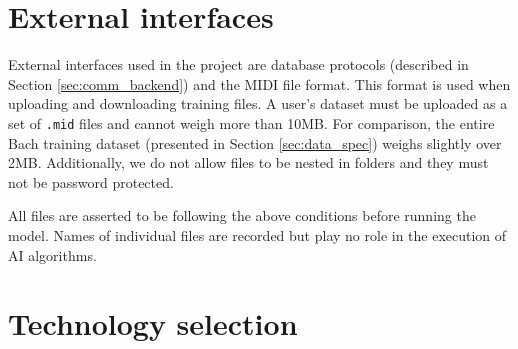 \documentclass[a4paper, 11pt, twoside]{report}
\theoremstyle{definition}
\begin{document}
\section{External interfaces} \label{ex_interfaces}

External interfaces used in the project are database protocols (described in Section \ref{sec:comm_backend}) and the MIDI file format. This format is used when uploading and downloading training files. A user's dataset must be uploaded as a set of \texttt{.mid} files and cannot weigh more than 10MB. For comparison, the entire Bach training dataset (presented in Section \ref{sec:data_spec}) weighs slightly over 2MB. Additionally, we do not allow files to be nested in folders and they must not be password protected. \par
All files are asserted to be following the above conditions before running the model. Names of individual files are recorded but play no role in the execution of AI algorithms. \par


\section{Technology selection}
\end{document}
